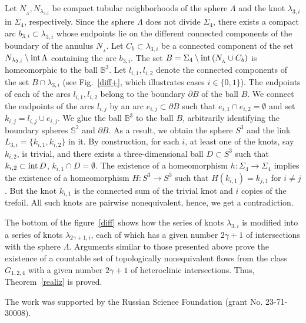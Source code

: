\documentclass[%
 aip,
 amsmath,amssymb,
preprint,%
]{revtex4-1}
\begin{document}
Let $N_{_\Lambda}, N_{\lambda_{3,i}}$ be compact tubular neighborhoods of the sphere $\Lambda$ and the knot $\lambda_{3,i}$ in $\Sigma_4$, respectively. Since the sphere $\Lambda$ does not divide $\Sigma_4$, there exists a compact arc $b_{3,i}\subset \lambda_{3,i}$ whose endpoints lie on the  different connected components of the boundary of the annulus $N_{_\Lambda}$. Let $C_b\subset \lambda_{3,i}$ be a connected component of the set $N_{\lambda_{3,i}}\setminus {\rm int}\,\Lambda$ containing the arc $b_{3,i}$. The set $B=\Sigma_4\setminus {\rm int}\, (N_{_\Lambda}\cup  C_{b})$ is homeomorphic to the ball $\mathbb B^3$. Let $l_{i,1}, l_{i,2}$ denote the connected components of the set $B\cap \lambda_{3,i}$ (see Fig.~\ref{diff+}, which illustrates cases $i\in \{0,1\}$). The endpoints of each of the arcs $l_{i,1}, l_{i,2}$ belong to the boundary $\partial B$ of the ball $B$. We  connect the endpoints of the arcs $l_{i,j}$ by an arc $e_{i,j}\subset \partial B$ such that $e_{i,1}\cap e_{i,2}=\emptyset$ and set  $k_{i,j}=l_{i,j}\cup e_{i,j}$. We glue the ball $\mathbb B^3$ to the ball $B$, arbitrarily identifying the boundary spheres $\mathbb S^2$ and  $\partial B$. As a result, we obtain the sphere $S^3$ and the link $L_{3,i}=\{k_{i,1}, k_{i,2}\}$ in it. By construction, for each $i$, at least one of the knots, say $k_{i,2}$, is trivial, and there exists a three-dimensional ball $D\subset S^3$ such that $k_{i,2}\subset {\rm int}\, D$, $k_{i,1}\cap D=\emptyset$.
The existence of a homeomorphism $h: \Sigma_4\to \Sigma_4$ implies the existence of a homeomorphism $H: S^3\to S^3$ such that $H(k_{i,1})=k_{j,1}$ for $i\neq j$. But the knot $k_{i,1}$ is the connected sum of the trivial knot and $i$ copies of the trefoil. All such knots are pairwise nonequivalent, hence, we get a contradiction.  

The bottom of the figure~\ref{diff} shows how the series of knots $\lambda_{3,i}$ is modified into a series of knots $\lambda_{2\gamma+1,i}$, each of which has a given number $2\gamma+1$ of intersections with the sphere $\Lambda$. Arguments similar to those presented above prove the existence of a countable set of topologically nonequivalent flows from the class $G_{1,2,4}$ with a given number $2\gamma+1$ of heteroclinic intersections. Thus, Theorem~\ref{realiz} is proved.


\begin{acknowledgments}
The work was supported by the Russian Science Foundation (grant No. 23-71-30008).
\end{acknowledgments}


\nocite{*}
\end{document}
